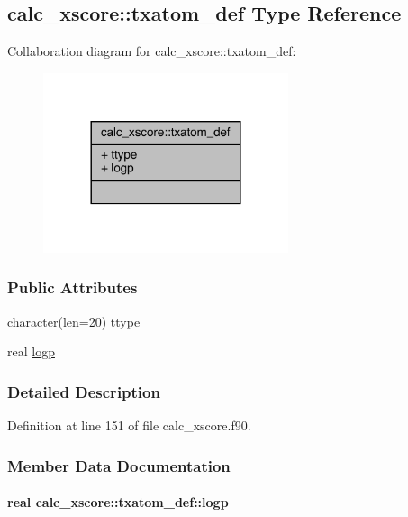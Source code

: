 \hypertarget{structcalc__xscore_1_1txatom__def}{\subsection{calc\-\_\-xscore\-:\-:txatom\-\_\-def Type Reference}
\label{structcalc__xscore_1_1txatom__def}
}


Collaboration diagram for calc\-\_\-xscore\-:\-:txatom\-\_\-def\-:
\nopagebreak
\begin{figure}[H]
\begin{center}
\leavevmode
\includegraphics[width=204pt]{structcalc__xscore_1_1txatom__def__coll__graph}
\end{center}
\end{figure}
\subsubsection*{Public Attributes}
\begin{DoxyCompactItemize}
\item 
character(len=20) \hyperlink{structcalc__xscore_1_1txatom__def_a3fe66b31c2ef6d9b4f01fa236ed60cbe}{ttype}
\item 
real \hyperlink{structcalc__xscore_1_1txatom__def_add9bd1e763f4a8c6a2373946bc41e99f}{logp}
\end{DoxyCompactItemize}


\subsubsection{Detailed Description}


Definition at line 151 of file calc\-\_\-xscore.\-f90.



\subsubsection{Member Data Documentation}
\hypertarget{structcalc__xscore_1_1txatom__def_add9bd1e763f4a8c6a2373946bc41e99f}{
\paragraph[{logp}]{\setlength{\rightskip}{0pt plus 5cm}real calc\-\_\-xscore\-::txatom\-\_\-def\-::logp}}\label{structcalc__xscore_1_1txatom__def_add9bd1e763f4a8c6a2373946bc41e99f}


